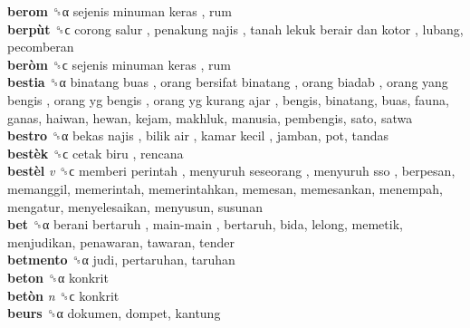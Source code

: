 \textbf{berom} ␝α   sejenis minuman keras , rum  \\
\textbf{berpùt} ␝ϲ   corong salur ,  penakung najis ,  tanah lekuk berair dan kotor , lubang, pecomberan  \\
\textbf{beròm} ␝ϲ   sejenis minuman keras , rum  \\
\textbf{bestia} ␝α   binatang buas ,  orang bersifat binatang ,  orang biadab ,  orang yang bengis ,  orang yg bengis ,  orang yg kurang ajar , bengis, binatang, buas, fauna, ganas, haiwan, hewan, kejam, makhluk, manusia, pembengis, sato, satwa  \\
\textbf{bestro} ␝α   bekas najis ,  bilik air ,  kamar kecil , jamban, pot, tandas  \\
\textbf{bestèk} ␝ϲ   cetak biru , rencana  \\
\textbf{bestèl} \emph{v}  ␝ϲ   memberi perintah ,  menyuruh seseorang ,  menyuruh sso , berpesan, memanggil, memerintah, memerintahkan, memesan, memesankan, menempah, mengatur, menyelesaikan, menyusun, susunan  \\
\textbf{bet} ␝α   berani bertaruh ,  main-main , bertaruh, bida, lelong, memetik, menjudikan, penawaran, tawaran, tender  \\
\textbf{betmento} ␝α  judi, pertaruhan, taruhan  \\
\textbf{beton} ␝α  konkrit  \\
\textbf{betòn} \emph{n}  ␝ϲ  konkrit  \\
\textbf{beurs} ␝α  dokumen, dompet, kantung  \\
